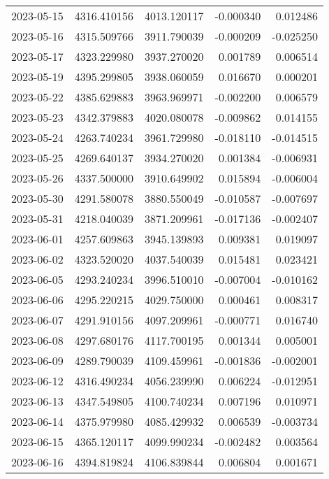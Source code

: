\begin{tabular}{lrrrr}
2023-05-15 & 4316.410156 & 4013.120117 &       -0.000340 &     0.012486 \\
2023-05-16 & 4315.509766 & 3911.790039 &       -0.000209 &    -0.025250 \\
2023-05-17 & 4323.229980 & 3937.270020 &        0.001789 &     0.006514 \\
2023-05-19 & 4395.299805 & 3938.060059 &        0.016670 &     0.000201 \\
2023-05-22 & 4385.629883 & 3963.969971 &       -0.002200 &     0.006579 \\
2023-05-23 & 4342.379883 & 4020.080078 &       -0.009862 &     0.014155 \\
2023-05-24 & 4263.740234 & 3961.729980 &       -0.018110 &    -0.014515 \\
2023-05-25 & 4269.640137 & 3934.270020 &        0.001384 &    -0.006931 \\
2023-05-26 & 4337.500000 & 3910.649902 &        0.015894 &    -0.006004 \\
2023-05-30 & 4291.580078 & 3880.550049 &       -0.010587 &    -0.007697 \\
2023-05-31 & 4218.040039 & 3871.209961 &       -0.017136 &    -0.002407 \\
2023-06-01 & 4257.609863 & 3945.139893 &        0.009381 &     0.019097 \\
2023-06-02 & 4323.520020 & 4037.540039 &        0.015481 &     0.023421 \\
2023-06-05 & 4293.240234 & 3996.510010 &       -0.007004 &    -0.010162 \\
2023-06-06 & 4295.220215 & 4029.750000 &        0.000461 &     0.008317 \\
2023-06-07 & 4291.910156 & 4097.209961 &       -0.000771 &     0.016740 \\
2023-06-08 & 4297.680176 & 4117.700195 &        0.001344 &     0.005001 \\
2023-06-09 & 4289.790039 & 4109.459961 &       -0.001836 &    -0.002001 \\
2023-06-12 & 4316.490234 & 4056.239990 &        0.006224 &    -0.012951 \\
2023-06-13 & 4347.549805 & 4100.740234 &        0.007196 &     0.010971 \\
2023-06-14 & 4375.979980 & 4085.429932 &        0.006539 &    -0.003734 \\
2023-06-15 & 4365.120117 & 4099.990234 &       -0.002482 &     0.003564 \\
2023-06-16 & 4394.819824 & 4106.839844 &        0.006804 &     0.001671 \\

\end{tabular}

